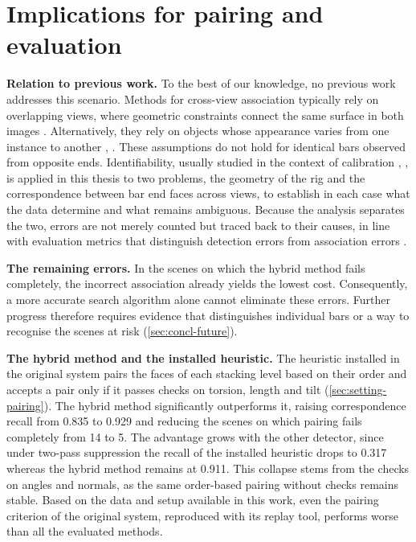 \documentclass[a4paper, 12pt, twoside]{book}
\newcommand{\citev}[1]{\citeauthor{#1} \citeyear{#1} \cite{#1}}
\begin{document}
\section{Implications for pairing and evaluation}
\label{sec:concl-implications}

\textbf{Relation to previous work.} To the best of our knowledge, no previous work addresses this scenario. Methods for cross-view association typically rely on overlapping views, where geometric constraints connect the same surface in both images \citev{sun2025}. Alternatively, they rely on objects whose appearance varies from one instance to another \citev{cai2020}, \citev{schraml2015}. These assumptions do not hold for identical bars observed from opposite ends. Identifiability, usually studied in the context of calibration \citev{maye2016}, \citev{nobre2019}, is applied in this thesis to two problems, the geometry of the rig and the correspondence between bar end faces across views, to establish in each case what the data determine and what remains ambiguous. Because the analysis separates the two, errors are not merely counted but traced back to their causes, in line with evaluation metrics that distinguish detection errors from association errors \citev{luiten2021}.

\textbf{The remaining errors.} In the scenes on which the hybrid method fails completely, the incorrect association already yields the lowest cost. Consequently, a more accurate search algorithm alone cannot eliminate these errors. Further progress therefore requires evidence that distinguishes individual bars or a way to recognise the scenes at risk (\cref{sec:concl-future}).

\textbf{The hybrid method and the installed heuristic.} The heuristic installed in the original system pairs the faces of each stacking level based on their order and accepts a pair only if it passes checks on torsion, length and tilt (\cref{sec:setting-pairing}). The hybrid method significantly outperforms it, raising correspondence recall from 0.835 to 0.929 and reducing the scenes on which pairing fails completely from 14 to 5. The advantage grows with the other detector, since under two-pass suppression the recall of the installed heuristic drops to 0.317 whereas the hybrid method remains at 0.911. This collapse stems from the checks on angles and normals, as the same order-based pairing without checks remains stable. Based on the data and setup available in this work, even the pairing criterion of the original system, reproduced with its replay tool, performs worse than all the evaluated methods.
\end{document}
